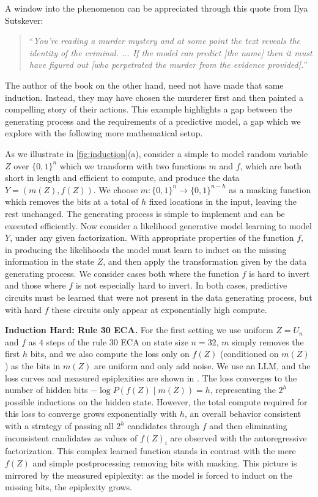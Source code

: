 \documentclass[twoside]{article}
\begin{document}
A window into the phenomenon can be appreciated through this quote from Ilya Sutskever:
\begin{quote}
    ``\emph{You're reading a murder mystery and at some point the text reveals the identity of the criminal. ... If the model can predict [the name] then it must have figured out [who perpetrated the murder from the evidence provided].}'' \citep{sutskever2019gpt2}
\end{quote}
The author of the book on the other hand, need not have made that same induction. Instead, they may have chosen the murderer first and then painted a compelling story of their actions. 
This example highlights a gap between the generating process and the requirements of a predictive model, a gap which we explore with the following more mathematical setup.

As we illustrate in \autoref{fig:induction}(a), consider a simple to model random variable $Z$ over $\{0,1\}^n$ which we transform with two functions $m$ and $f$, which are both short in length and efficient to compute, and produce the data $Y=(m(Z),f(Z))$. We choose $m: \{0,1\}^n \to \{0,1\}^{n-h}$ as a masking function which removes the bits at a total of $h$ fixed locations in the input, leaving the rest unchanged. The generating process is simple to implement and can be executed efficiently. Now consider a likelihood generative model learning to model $Y$, under any given factorization. With appropriate properties of the function $f$, in producing the likelihoods the model must learn to induct on the missing information in the state $Z$, and then apply the transformation given by the data generating process. We consider cases both where the function $f$ is hard to invert and those where $f$ is not especially hard to invert. In both cases, predictive circuits must be learned that were not present in the data generating process, but with hard $f$ these circuits only appear at exponentially high compute. 

\textbf{Induction Hard: Rule 30 ECA.} For the first setting we use uniform $Z=U_n$ and $f$ as $4$ steps of the rule 30 ECA on state size $n=32$, $m$ simply removes the first $h$ bits, and we also compute the loss only on $f(Z)$ (conditioned on $m(Z)$) as the bits in $m(Z)$ are uniform and only add noise. We use an LLM, and the loss curves and measured epiplexities are shown in . The loss converges to the number of hidden bits $-\log P(f(Z)\mid m(Z)) = h$, representing the $2^h$ possible inductions on the hidden state. However, the total compute required for this loss to converge grows exponentially with $h$, an overall behavior consistent with a strategy of passing all $2^h$ candidates through $f$ and then eliminating inconsistent candidates as values of $f(Z)_i$ are observed with the autoregressive factorization. This complex learned function stands in contrast with the mere $f(Z)$ and simple postprocessing removing bits with masking. This picture is mirrored by the measured epiplexity: as the model is forced to induct on the missing bits, the epiplexity grows.
\end{document}
